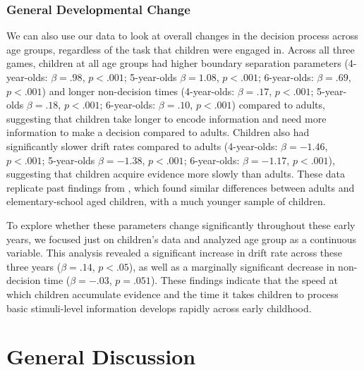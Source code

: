 \documentclass[10pt,letterpaper]{article}
\begin{document}
\subsubsection{General Developmental Change}
We can also use our data to look at overall changes in the decision process across age groups, regardless of the task that children were engaged in. Across all three games, children at all age groups had higher boundary separation parameters (4-year-olds: $\beta = .98$, $p <.001$; 5-year-olds $\beta = 1.08$, $p <.001$; 6-year-olds: $\beta = .69$, $p <.001$) and longer non-decision times (4-year-olds: $\beta = .17$, $p <.001$; 5-year-olds $\beta = .18$, $p <.001$; 6-year-olds: $\beta = .10$, $p <.001$) compared to adults, suggesting that children take longer to encode information and need more information to make a decision compared to adults.  Children also had significantly slower drift rates compared to adults (4-year-olds: $\beta = -1.46$, $p <.001$; 5-year-olds $\beta = -1.38$, $p <.001$; 6-year-olds: $\beta = -1.17$, $p <.001$), suggesting that children acquire evidence more slowly than adults.  These data replicate past findings from , which found similar differences between adults and elementary-school aged children, with a much younger sample of children.  

To explore whether these parameters change significantly throughout these early years, we focused just on children's data and analyzed age group as a continuous variable.  This analysis revealed a significant increase in drift rate across these three years ($\beta = .14$, $p < .05$), as well as a marginally significant decrease in non-decision time ($\beta = -.03$, $p = .051$).  These findings indicate that the speed at which children accumulate evidence and the time it takes children to process basic stimuli-level information develops rapidly across early childhood.  


\section{General Discussion}

%



\setlength{\bibleftmargin}{.125in}
\setlength{\bibindent}{-\bibleftmargin}


\end{document}
